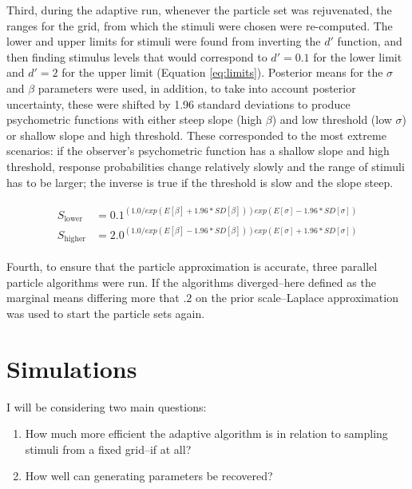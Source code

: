 \documentclass{article}\usepackage{knitr}
\begin{document}
Third, during the adaptive run, whenever the particle set was rejuvenated, the ranges for the grid, from which the stimuli were chosen were re-computed. The lower and upper limits for stimuli were found from inverting the $d'$ function, and then finding stimulus levels that would correspond to $d' = 0.1$ for the lower limit and $d' = 2$ for the upper limit (Equation \ref{eq:limits}). Posterior means for the $\sigma$ and $\beta$ parameters were used, in addition, to take into account posterior uncertainty, these were shifted by 1.96 standard deviations to produce psychometric functions with either steep slope (high $\beta$) and low threshold (low $\sigma$) or shallow slope and high threshold. These corresponded to the most extreme scenarios: if the observer's psychometric function has a shallow slope and high threshold, response probabilities change relatively slowly and the range of stimuli has to be larger; the inverse is true if the threshold is slow and the slope steep. 

\begin{align}
\begin{split}
\label{eq:limits}
S_{\text{lower}} &= 0.1^{(1.0 / exp(E[\beta] + 1.96 * SD[\beta])) exp(E[\sigma] - 1.96 * SD[\sigma])}
\\ 
S_{\text{higher}} &= 2.0^ {(1.0 / exp(E[\beta] - 1.96 * SD[\beta])) exp(E[\sigma] + 1.96 * SD[\sigma])}
\end{split}
\end{align}

Fourth, to ensure that the particle approximation is accurate, three parallel particle algorithms were run. If the algorithms diverged--here defined as the marginal means differing more that $.2$ on the prior scale--Laplace approximation was used to start the particle sets again.

\newpage


\section{Simulations}
\label{sec:simulations}

I will be considering two main questions: 

\begin{enumerate}
  \item How much more efficient the adaptive algorithm is in relation to sampling stimuli from a fixed grid--if at all? 
  \item How well can generating parameters be recovered?
\end{enumerate}
\end{document}
